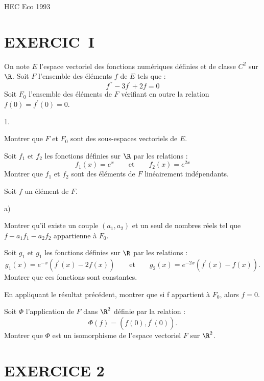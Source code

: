 \documentclass[11pt]{article}%
\begin{document}
\begin{center}
{\huge HEC Eco 1993}
\end{center}

\section*{EXERCIC\E\ I}

On note $E$ l'espace vectoriel des fonctions numériques définies et de
classe $C^{2}$ sur $\R$. Soit $F$ l'ensemble des éléments $f$ de $E$
tels que :
\[
f^{\prime \prime }-3f^{\prime } + 2f = 0
\]
Soit $F_{0}$ l'ensemble des éléments de $F$ vérifiant en outre la
relation $f(0) = f^{\prime }(0) = 0$.

\begin{noliste}{1.}
 \setlength{\itemsep}{4mm}
\item Montrer que $F$ et $F_{0}$ sont des sous-espaces vectoriels de
$E$.

\item Soit $f_{1}$ et $f_{2}$ les fonctions définies sur $\R$ par
les relations :
\[
f_{1}(x) = e^{x}\qquad \text{et}\qquad f_{2}(x) = e^{2x}
\]
Montrer que $f_{1}$ et $f_{2}$ sont des éléments de $F$ linéairement
indépendants.

\item Soit $f$ un élément de $F$.

\begin{noliste}{a)}
 \setlength{\itemsep}{2mm}
\item Montrer qu'il existe un couple $(a_{1},a_{2})$ et un seul de
nombres réels tel que $f-a_{1}f_{1}-a_{2}f_{2}$ appartienne à $F_{0}$.

\item Soit $g_{1}$ et $g_{1}$ les fonctions définies sur $\R$ par
les relations :
\[
g_{1}(x) = e^{-x}(f^{\prime }(x)-2f(x))\qquad \text{et}\qquad
g_{2}(x) = e^{-2x}(f^{\prime }(x)-f(x)).
\]
Montrer que ces fonctions sont constantes.

\item En appliquant le résultat précédent, montrer que si f appartient
à $F_{0}$, alors $f = 0$.
\end{noliste}

\item Soit $\Phi $ l'application de $F$ dans $\R^{2}$ définie par la
relation :
\[
\Phi (f) = (f(0),f^{\prime }(0)).
\]
Montrer que $\Phi $ est un isomorphisme de l'espace vectoriel $F$ sur
$\R^{2}$.
\end{noliste}

\section*{EXERCICE 2}
\end{document}
